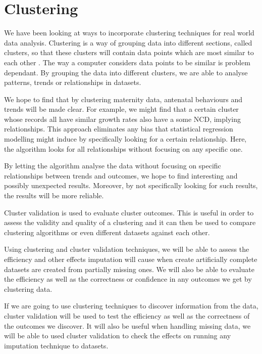 \documentclass[bsc]{abdnthesis}
\begin{document}
\section{Clustering} %
\label{sec:clustering}
We have been looking at ways to incorporate clustering techniques for real world data analysis.  Clustering is a way of grouping data into different sections, called clusters, so that these clusters will contain data points which are most similar to each other \cite{ cluster}. The way a computer considers data points to be similar is problem dependant. By grouping the data into different clusters, we are able to analyse patterns, trends or relationships in datasets. 

We hope to find that by clustering maternity data, antenatal behaviours and trends will be made clear. For example, we might find that a certain cluster whose records all have similar growth rates also have a some NCD, implying relationships. This approach eliminates any bias that statistical regression modelling might induce by specifically looking for a certain relationship. Here, the algorithm looks for all relationships without focusing on any specific one. 

By letting the algorithm analyse the data without focusing on specific relationships between trends and outcomes, we hope to find interesting and possibly unexpected results. Moreover, by not specifically looking for such results, the results will be more reliable. 

Cluster validation is used to evaluate cluster outcomes\cite{ cluster-val}. This is useful in order to assess the validity and quality of a clustering and it can then be used to compare clustering algorithms or even different datasets against each other. 

Using clustering and cluster validation techniques, we will be able to assess the efficiency and other effects imputation will cause when create artificially complete datasets are created from partially missing ones. We will also be able to evaluate the efficiency as well as the correctness or confidence in any outcomes we get by clustering data. 

If we are going to use clustering techniques to discover information from the data, cluster validation will be used to test the efficiency as well as the correctness of the outcomes we discover. It will also be useful when handling missing data, we will be able to used cluster validation to check the effects on running any imputation technique to datasets.
\end{document}
